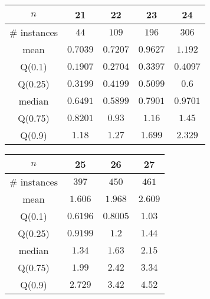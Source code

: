 \begin{tabular}{c|cccc} 
\hline 
$n$ & 21 & 22 & 23 & 24 \tabularnewline 
\hline 
\hline 
\# instances & $44$ & $109$ & $196$ & $306$ \tabularnewline 
mean & $0.7039$ & $0.7207$ & $0.9627$ & $1.192$ \tabularnewline 
Q(0.1) & $0.1907$ & $0.2704$ & $0.3397$ & $0.4097$ \tabularnewline 
Q(0.25) & $0.3199$ & $0.4199$ & $0.5099$ & $0.6$ \tabularnewline 
median & $0.6491$ & $0.5899$ & $0.7901$ & $0.9701$ \tabularnewline 
Q(0.75) & $0.8201$ & $0.93$ & $1.16$ & $1.45$ \tabularnewline 
Q(0.9) & $1.18$ & $1.27$ & $1.699$ & $2.329$ \tabularnewline 
\hline 
\end{tabular} 
\medskip{} 

\begin{tabular}{c|ccc} 
\hline 
$n$ & 25 & 26 & 27 \tabularnewline 
\hline 
\hline 
\# instances & $397$ & $450$ & $461$ \tabularnewline 
mean & $1.606$ & $1.968$ & $2.609$ \tabularnewline 
Q(0.1) & $0.6196$ & $0.8005$ & $1.03$ \tabularnewline 
Q(0.25) & $0.9199$ & $1.2$ & $1.44$ \tabularnewline 
median & $1.34$ & $1.63$ & $2.15$ \tabularnewline 
Q(0.75) & $1.99$ & $2.42$ & $3.34$ \tabularnewline 
Q(0.9) & $2.729$ & $3.42$ & $4.52$ \tabularnewline 
\hline 
\end{tabular} 
\medskip{} 


